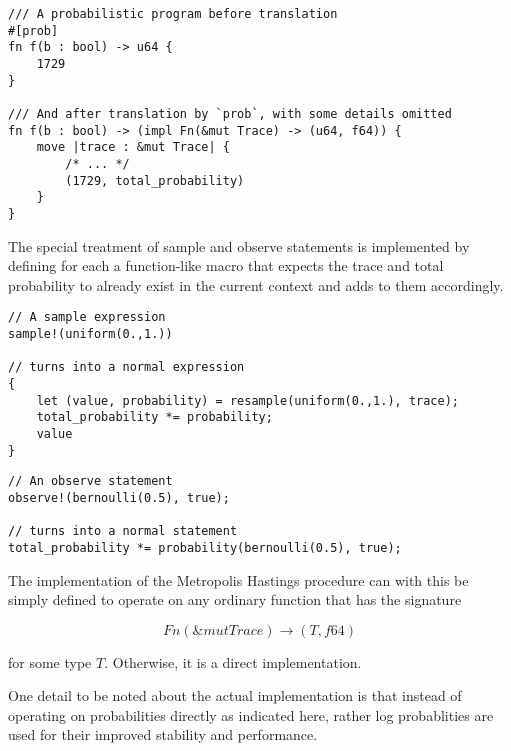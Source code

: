 \begin{minipage}{\linewidth}
\begin{lstlisting}
/// A probabilistic program before translation
#[prob]
fn f(b : bool) -> u64 {
    1729
}

/// And after translation by `prob`, with some details omitted
fn f(b : bool) -> (impl Fn(&mut Trace) -> (u64, f64)) {
    move |trace : &mut Trace| {
        /* ... */
        (1729, total_probability)
    }
}
\end{lstlisting}
\end{minipage}

The special treatment of sample and observe statements is implemented by defining for each a function-like macro that expects the trace and total probability to already exist in the current context and adds to them accordingly.

\begin{minipage}{\linewidth}
\begin{lstlisting}
// A sample expression
sample!(uniform(0.,1.))

// turns into a normal expression
{
    let (value, probability) = resample(uniform(0.,1.), trace);
    total_probability *= probability;
    value
}
\end{lstlisting}
\end{minipage}

\begin{minipage}{\linewidth}
\begin{lstlisting}
// An observe statement
observe!(bernoulli(0.5), true);

// turns into a normal statement
total_probability *= probability(bernoulli(0.5), true);
\end{lstlisting}
\end{minipage}

The implementation of the Metropolis Hastings procedure can with this be simply defined to operate on any ordinary function that has the signature

\begin{equation*}
    Fn(\&mut Trace) \rightarrow (T, f64)
\end{equation*}

for some type $T$. Otherwise, it is a direct implementation.

One detail to be noted about the actual implementation is that instead of operating on probabilities directly as indicated here, rather log probablities are used for their improved stability and performance.
